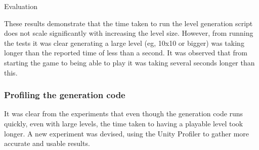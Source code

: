\documentclass[final]{cmpreport}
\begin{document}
\begin{section}{Evaluation}
\begin{table}

    \centering
    \caption{Timing results from timing the level generation code of varying size of levels}
    \label{tab:genres1}

\end{table}

These results demonstrate that the time taken to run the level generation script does not scale significantly with increasing the level size. However, from running the tests it was clear generating a large level (eg, 10x10 or bigger) was taking longer than the reported time of less than a second. It was observed that from starting the game to being able to play it was taking several seconds longer than this.

\subsubsection{Profiling the generation code}
It was clear from the experiments that even though the generation code runs quickly, even with large levels, the time taken to having a playable level took longer. A new experiment was devised, using the Unity Profiler to gather more accurate and usable results.


\end{section}
\end{document}
